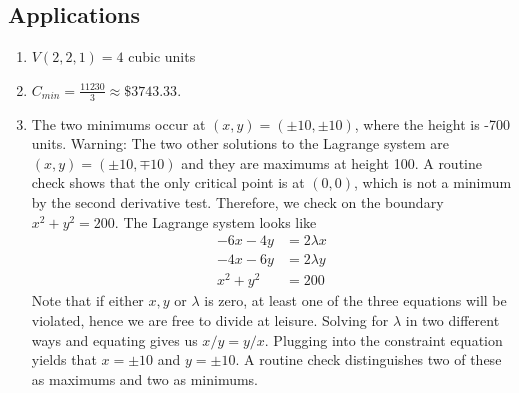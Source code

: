 \subsection*{Applications}
\begin{enumerate}[resume]
    \item {}  %
    {%
    $V(2,2,1)=4$ cubic units
    }
    {%
    } 
    \item {}
    {%
    $ C_{min}=\frac{11230}{3} \approx \$3743.33$.
    }
    {%
    } 
    \item {}
    {%
    The two minimums occur at $(x,y)= (\pm 10,\pm 10)$, where the height is -700 units. Warning: The two other solutions to the Lagrange system are $(x,y)=(\pm 10,\mp 10)$ and they are maximums at height 100.
    }
    {A routine check shows that the only critical point is at $(0,0)$, which is not a minimum by the second derivative test. Therefore, we check on the boundary $x^2+y^2 = 200$. The Lagrange system looks like 
    \begin{align*}
        -6x-4y &= 2\lambda x\\
        -4x-6y &= 2\lambda y\\
        x^2+y^2 &= 200
    \end{align*}
    Note that if either $x,y$ or $\lambda$ is zero, at least one of the three equations will be violated, hence we are free to divide at leisure. Solving for $\lambda$ in two different ways and equating gives us $x/y = y/x$. Plugging into the constraint equation yields that $x=\pm 10$ and $y=\pm 10$. A routine check distinguishes two of these as maximums and two as minimums.  
    } 
\end{enumerate}
